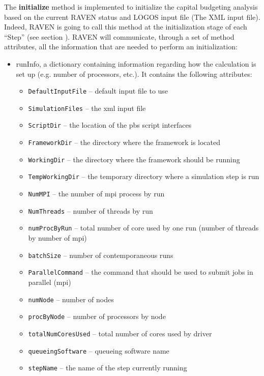 The \textbf{initialize} method is implemented  to initialize the capital budgeting analysis
based on the current RAVEN status and LOGOS input file (The XML input file).
%
 \\Indeed, RAVEN is going to call this method at the initialization stage of
 each ``Step'' (see section \cite{RAVENuserManual}).
%
RAVEN will communicate, through a set of method attributes, all the information
that are needed to perform an initialization:
\begin{itemize}
  \item runInfo, a dictionary containing information regarding how the
  calculation is set up (e.g. number of processors, etc.).
  It contains the following attributes:
  \begin{itemize}
    \item \texttt{DefaultInputFile} -- default input file to use
    \item \texttt{SimulationFiles} -- the xml input file
    \item \texttt{ScriptDir} -- the location of the pbs script interfaces
    \item \texttt{FrameworkDir} -- the directory where the framework is located
    \item \texttt{WorkingDir} -- the directory where the framework should be
    running
    \item \texttt{TempWorkingDir} -- the temporary directory where a simulation
    step is run
    \item \texttt{NumMPI} -- the number of mpi process by run
    \item \texttt{NumThreads} -- number of threads by run
    \item \texttt{numProcByRun} -- total number of core used by one run (number
    of threads by number of mpi)
    \item \texttt{batchSize} -- number of contemporaneous runs
    \item \texttt{ParallelCommand} -- the command that should be used to submit
    jobs in parallel (mpi)
    \item \texttt{numNode} -- number of nodes
    \item \texttt{procByNode} -- number of processors by node
    \item \texttt{totalNumCoresUsed} -- total number of cores used by driver
    \item \texttt{queueingSoftware} -- queueing software name
    \item \texttt{stepName} -- the name of the step currently running

\end{itemize}
\end{itemize}
